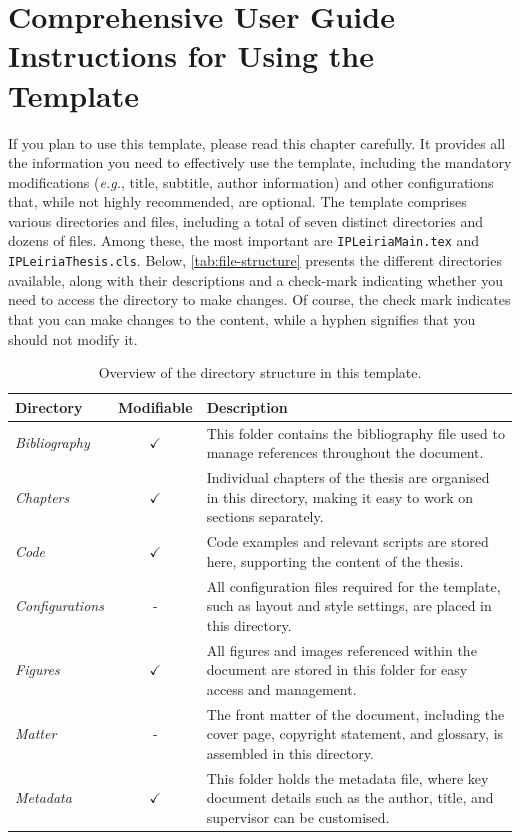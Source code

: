 \chapter[Comprehensive User Guide: Instructions for Using the Template]{Comprehensive User Guide Instructions for Using the Template}
\label{cp:user-guide}

If you plan to use this template, please read this chapter carefully. It provides all the information you need to effectively use the template, including the mandatory modifications (\textit{e.g.}, title, subtitle, author information) and other configurations that, while not highly recommended, are optional. The template comprises various directories and files, including a total of seven distinct directories and dozens of files. Among these, the most important are \texttt{IPLeiriaMain.tex} and \texttt{IPLeiriaThesis.cls}. Below, \autoref{tab:file-structure} presents the different directories available, along with their descriptions and a check-mark indicating whether you need to access the directory to make changes. Of course, the check mark indicates that you can make changes to the content, while a hyphen signifies that you should not modify it.

\begin{table}[!htpb]
    \setlength{\extrarowheight}{2pt}
    \caption[Directory structure and file organisation]{Overview of the directory structure in this template.}
    \label{tab:file-structure}
    \begin{tabularx}{\textwidth}{|l!{\vrule}c!{\vrule}X|}
    \hline
    \textbf{Directory} & \textbf{Modifiable} & \textbf{Description} \\ [0em]
    \midrule
    \textit{Bibliography} & $\checkmark$ & This folder contains the bibliography file used to manage references throughout the document. \\
    \textit{Chapters} & $\checkmark$ & Individual chapters of the thesis are organised in this directory, making it easy to work on sections separately. \\
    \textit{Code} & $\checkmark$ & Code examples and relevant scripts are stored here, supporting the content of the thesis. \\
    \textit{Configurations} & - & All configuration files required for the template, such as layout and style settings, are placed in this directory. \\
    \textit{Figures} & $\checkmark$ & All figures and images referenced within the document are stored in this folder for easy access and management. \\
    \textit{Matter} & - & The front matter of the document, including the cover page, copyright statement, and glossary, is assembled in this directory. \\
    \textit{Metadata} & $\checkmark$ & This folder holds the metadata file, where key document details such as the author, title, and supervisor can be customised. \\
    \bottomrule
    \end{tabularx}
\end{table}

